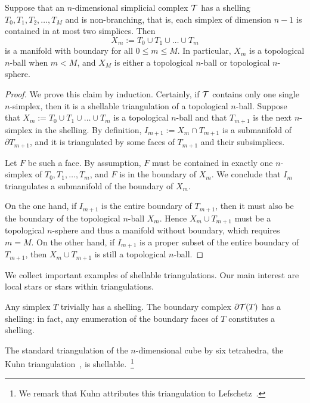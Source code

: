\documentclass[12pt,a4paper]{article}
\begin{document}
\begin{lemma}    
    Suppose that an $n$-dimensional simplicial complex ${\mathcal T}$ has a shelling $T_{0}, T_{1}, T_{2}, \dots, T_{M}$ and is non-branching, 
    that is, each simplex of dimension $n-1$ is contained in at most two simplices. 
    Then
    $$
        X_{m} := T_{0} \cup T_{1} \cup \dots \cup T_{m}
    $$ 
    is a manifold with boundary for all $0 \leq m \leq M$.
    In particular, $X_{m}$ is a topological $n$-ball when $m < M$, 
    and 
    $X_{M}$ is either a topological $n$-ball or topological $n$-sphere. 
\end{lemma}
\begin{proof}  
    We prove this claim by induction. 
    Certainly, if ${\mathcal T}$ contains only one single $n$-simplex, then it is a shellable triangulation of a topological $n$-ball. 
    Suppose that $X_m := T_{0} \cup T_{1} \cup \dots \cup T_{m}$ is a topological $n$-ball and that $T_{m+1}$ is the next $n$-simplex in the shelling.
    By definition, $I_{m+1} := X_{m} \cap T_{m+1}$ is a submanifold of $\partial T_{m+1}$,
    and it is triangulated by some faces of $T_{m+1}$ and their subsimplices. 
    
    Let $F$ be such a face. 
    By assumption, $F$ must be contained in exactly one $n$-simplex of $T_{0}, T_{1}, \dots, T_{m}$,
    and $F$ is in the boundary of $X_{m}$. We conclude that $I_{m}$ triangulates a submanifold of the boundary of $X_{m}$.
    
    On the one hand, 
    if $I_{m+1}$ is the entire boundary of $T_{m+1}$, 
    then it must also be the boundary of the topological $n$-ball $X_{m}$. 
    Hence $X_{m} \cup T_{m+1}$ must be a topological $n$-sphere and thus a manifold without boundary, which requires $m = M$.
    On the other hand, 
    if $I_{m+1}$ is a proper subset of the entire boundary of $T_{m+1}$, 
    then $X_{m} \cup T_{m+1}$ is still a topological $n$-ball.
\end{proof}






We collect important examples of shellable triangulations.
Our main interest are local stars or stars within triangulations. 

\begin{example}
    Any simplex $T$ trivially has a shelling. The boundary complex $\partial {\mathcal T}(T)$ has a shelling:
    in fact, any enumeration of the boundary faces of $T$ constitutes a shelling.
\end{example}
\begin{example}
    The standard triangulation of the $n$-dimensional cube by six tetrahedra, the Kuhn triangulation~\cite{kuhn1960some}, is shellable.~\footnote{We remark that Kuhn attributes this triangulation to Lefschetz~\cite{lefschetz2015introduction}.}
\end{example}
\end{document}

